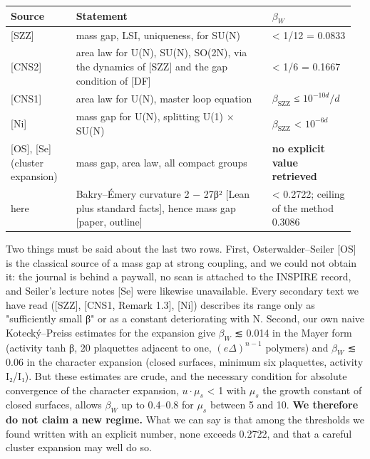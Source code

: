 \documentclass[11pt,a4paper]{article}
\theoremstyle{named}
\begin{document}
\begin{center}\begin{small}
\begin{tabular}{>{\raggedright\arraybackslash}p{0.182\linewidth}>{\raggedright\arraybackslash}p{0.547\linewidth}>{\raggedright\arraybackslash}p{0.231\linewidth}}
\hline
\textbf{Source} & \textbf{Statement} & \textbf{$β_W$} \\
\hline
{}[SZZ] & mass gap, LSI, uniqueness, for SU(N) & \textless{} 1/12 = 0.0833 \\
{}[CNS2] & area law for U(N), SU(N), SO(2N), via the dynamics of [SZZ] and the gap condition of [DF] & \textless{} 1/6 = 0.1667 \\
{}[CNS1] & area law for U(N), master loop equation & $β_{\mathrm{SZZ}}$ ≤ $10^{−10d}/d$ \\
{}[Ni] & mass gap for U(N), splitting U(1) × SU(N) & $β_{\mathrm{SZZ}}$ \textless{} $10^{−6d}$ \\
{}[OS], [Se] (cluster expansion) & mass gap, area law, all compact groups & \textbf{no explicit value retrieved} \\
here & Bakry–Émery curvature 2 − 27β² [Lean plus standard facts], hence mass gap [paper, outline] & \textless{} 0.2722; ceiling of the method 0.3086 \\
\hline
\end{tabular}
\end{small}\end{center}
Two things must be said about the last two rows. First, Osterwalder–Seiler [OS] is the classical source of a mass gap at strong coupling, and we could not obtain it: the journal is behind a paywall, no scan is attached to the INSPIRE record, and Seiler's lecture notes [Se] were likewise unavailable. Every secondary text we have read ([SZZ], [CNS1, Remark 1.3], [Ni]) describes its range only as "sufficiently small β" or as a constant deteriorating with N. Second, our own naive Kotecký–Preiss estimates for the expansion give $β_W$ ≲ 0.014 in the Mayer form (activity tanh β, 20 plaquettes adjacent to one, $(eΔ)^{n−1}$ polymers) and $β_W$ ≲ 0.06 in the character expansion (closed surfaces, minimum six plaquettes, activity I₂/I₁). But these estimates are crude, and the necessary condition for absolute convergence of the character expansion, $u·μ_s$ \textless{} 1 with $μ_s$ the growth constant of closed surfaces, allows $β_W$ up to 0.4–0.8 for $μ_s$ between 5 and 10. \textbf{We therefore do not claim a new regime.} What we can say is that among the thresholds we found written with an explicit number, none exceeds 0.2722, and that a careful cluster expansion may well do so.
\end{document}
